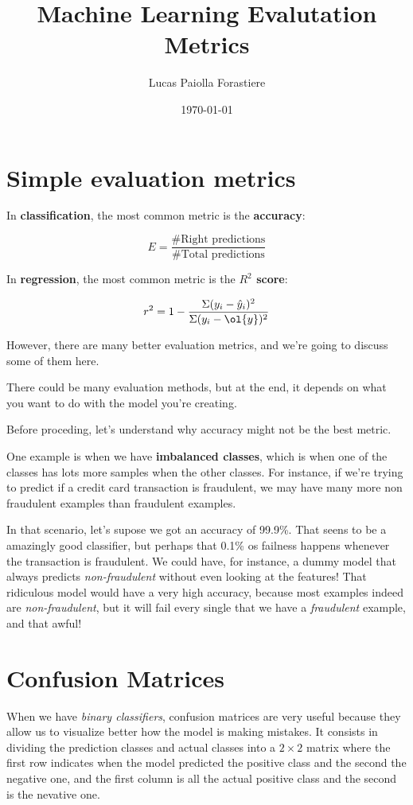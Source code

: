 \documentclass[12pt, a4paper, oneside]{article}
\title{Machine Learning Evalutation Metrics}
\date{\today}
\author{Lucas Paiolla Forastiere}
\begin{document}
\maketitle
\tableofcontents
\newpage

\section{Simple evaluation metrics}

In \textbf{classification}, the most common metric is the \textbf{accuracy}:

\[ E = \dfrac{\textrm{#Right predictions}}{\textrm{#Total predictions}}  \]

In \textbf{regression}, the most common metric is the \textbf{$R^2$ score}:

\[ r^2 = 1 - \dfrac{\Sigma(y_i-\hat{y}_i)^2}{\Sigma(y_i-\ol{y})^2} \]

However, there are many better evaluation metrics, and we're going to discuss
some of them here.

There could be many evaluation methods, but at the end, it depends on what you
want to do with the model you're creating.

Before proceding, let's understand why accuracy might not be the best metric.

One example is when we have \textbf{imbalanced classes}, which is when one of
the classes has lots more samples when the other classes. For instance, if we're
trying to predict if a credit card transaction is fraudulent, we may have many
more non fraudulent examples than fraudulent examples.

In that scenario, let's supose we got an accuracy of 99.9\%. That seens to be a
amazingly good classifier, but perhaps that 0.1\% os failness happens whenever
the transaction is fraudulent. We could have, for instance, a dummy model that
always predicts \textit{non-fraudulent} without even looking at the features!
That ridiculous model would have a very high accuracy, because most examples
indeed are \textit{non-fraudulent}, but it will fail every single that we have a
\textit{fraudulent} example, and that awful!

\section{Confusion Matrices}

When we have \textit{binary classifiers}, confusion matrices are very useful
because they allow us to visualize better how the model is making mistakes.
It consists in dividing the prediction classes and actual classes into a
$2\times 2$ matrix where the first row indicates when the model predicted the
positive class and the second the negative one, and the first column is all the
actual positive class and the second is the nevative one.
\end{document}
